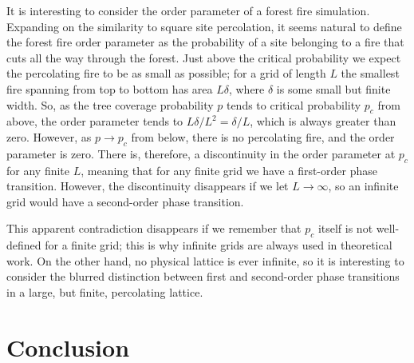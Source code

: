 \documentclass[%
 reprint,
 amsmath,amssymb,
 aps,
]{revtex4-2}
\begin{document}
It is interesting to consider the order parameter of a forest fire simulation. Expanding on the similarity to square site percolation, it seems natural to define the forest fire order parameter as the probability of a site belonging to a fire that cuts all the way through the forest. Just above the critical probability we expect the percolating fire to be as small as possible; for a grid of length $L$ the smallest fire spanning from top to bottom has area $L\delta$, where $\delta$ is some small but finite width. So, as the tree coverage probability $p$ tends to critical probability $p_c$ from above, the order parameter tends to $L\delta/L^2 = \delta/L$, which is always greater than zero. However, as $p\to p_c$ from below, there is no percolating fire, and the order parameter is zero. There is, therefore, a discontinuity in the order parameter at $p_c$ for any finite $L$, meaning that for any finite grid we have a first-order phase transition. However, the discontinuity disappears if we let $L\to\infty$, so an infinite grid would have a second-order phase transition. 

This apparent contradiction disappears if we remember that $p_c$ itself is not well-defined for a finite grid; this is why infinite grids are always used in theoretical work. On the other hand, no physical lattice is ever infinite, so it is interesting to consider the blurred distinction between first and second-order phase transitions in a large, but finite, percolating lattice.

\section{Conclusion}
\newpage
\end{document}
